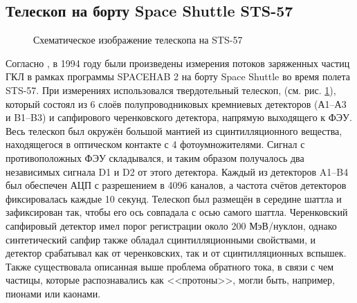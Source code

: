 \documentclass[12pt,a4paper]{report} %
\begin{document}
\subsection{Телескоп на борту Space Shuttle STS-57}
\begin{figure}
	\noindent{}
	\caption{Схематическое изображение телескопа на STS-57}
	\label{figSTS57}
\end{figure}
Согласно \cite{ShuttleSTS57}, в 1994 году были произведены измерения потоков заряженных частиц ГКЛ в рамках программы SPACEHAB 2 на борту Space Shuttle во время полета STS-57. При измерениях использовался твердотельный телескоп, (см. рис. \ref{figSTS57}), который состоял из 6 слоёв полупроводниковых кремниевых детекторов (А1–А3 и B1–B3) и сапфирового черенковского детектора, напрямую выходящего к ФЭУ. Весь телескоп был окружён большой мантией из сцинтилляционного вещества, находящегося в оптическом контакте с 4 фотоумножителями. Сигнал с противоположных ФЭУ складывался, и таким образом получалось два независимых сигнала D1 и D2 от этого детектора. Каждый из детекторов A1–B4 был обеспечен АЦП с разрешением в 4096 каналов, а частота счётов детекторов фиксировалась каждые 10 секунд. Телескоп был размещён в середине шаттла и зафиксирован так, чтобы его ось совпадала с осью самого шаттла. Черенковский сапфировый детектор имел порог регистрации около 200 МэВ/нуклон, однако синтетический сапфир также обладал сцинтилляционными свойствами, и детектор срабатывал как от черенковских, так и от сцинтилляционных вспышек. Также существовала описанная выше проблема обратного тока, в связи с чем частицы, которые распознавались как <<протоны>>, могли быть, например, пионами или каонами. 
\end{document}
